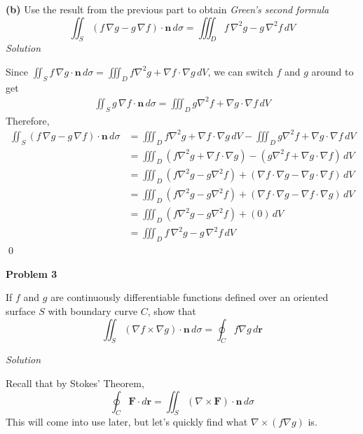 \documentclass{article}
\newcommand{\lrp}[1]{\left( #1 \right)}
\renewcommand{\r}[0]{\mathbf{r}}
\newcommand{\F}[0]{\mathbf{F}}
\newcommand{\n}[0]{\mathbf{n}}
\newcommand{\Solution}{\textit{Solution}}
\begin{document}
{}\textbf{(b)} Use the result from the previous part to obtain \textit{Green's second formula}
\begin{equation*}
    \iint_S \lrp{f\,\nabla g-g\,\nabla f}\cdot\n\,d\sigma=\iiint_D f\,\nabla^2g-g\,\nabla^2f\,dV
\end{equation*}
\Solution

Since $\displaystyle \iint_S f\,\nabla g\cdot \n\,d\sigma=\iiint_D f\nabla^2 g + \nabla f \cdot \nabla g \,dV$, we can switch $f$ and $g$ around to get
\begin{align*}
    \iint_S g\,\nabla f\cdot \n\,d\sigma=\iiint_D g\nabla^2 f + \nabla g \cdot \nabla f \,dV
\end{align*}
Therefore,
\begin{align*}
     \iint_S \lrp{f\,\nabla g-g\,\nabla f}\cdot\n\,d\sigma&=\iiint_D f\nabla^2 g + \nabla f \cdot \nabla g \,dV-\iiint_D g\nabla^2 f + \nabla g \cdot \nabla f \,dV\\
     &=\iiint_D \lrp{f\nabla^2 g + \nabla f \cdot \nabla g}-\lrp{g\nabla^2 f + \nabla g \cdot \nabla f}\,dV\tag{same $D$ region}\\
     &=\iiint_D \lrp{f\nabla^2 g - g\nabla^2 f }+ \lrp{\nabla f\cdot\nabla g - \nabla g \cdot\nabla f}\,dV\tag{rearrange}\\
     &=\iiint_D \lrp{f\nabla^2 g - g\nabla^2 f }+\lrp{\nabla f\cdot \nabla g - \nabla f \cdot \nabla g}\,dV\tag{dot products commute (order doesn't matter)}\\
     &=\iiint_D \lrp{f\nabla^2 g - g\nabla^2 f }+\lrp{0}\,dV\\
     &=\iiint_D f\,\nabla^2g-g\,\nabla^2f\,dV
\end{align*}
\qed
\newpage
{}
{}\textbf{Problem 3}

If $f$ and $g$ are continuously differentiable functions defined over an oriented surface $S$ with boundary curve $C$, show that
\begin{equation*}
    \iint_S \lrp{\nabla f \times \nabla g}\cdot \n\,d\sigma=\oint_C f\nabla g\,d\r
\end{equation*}

\Solution

Recall that by Stokes' Theorem,
\begin{equation*}
    \oint_C \F\cdot d\r=\iint_S \lrp{\nabla \times \F}\cdot \n\,d\sigma
\end{equation*}
This will come into use later, but let's quickly find what $\nabla \times \lrp{f\nabla g}$ is.
\end{document}
